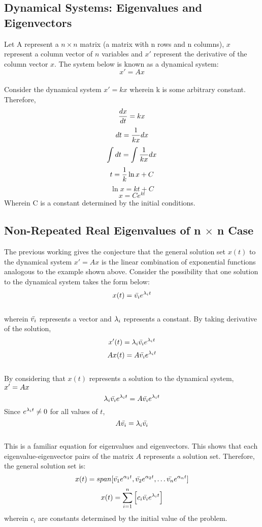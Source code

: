 \documentclass[a4paper, 12pt]{report}
\begin{document}
\begin{center}
\chapter{Dynamical Systems: Eigenvalues and Eigenvectors}
\begin{comment}
\end{comment}
Let A represent a $n \times n$ matrix (a matrix with n rows and n columns), $x$ represent a column vector of $n$ variables and $x'$ represent the derivative of the column vector $x$. The system below is known as a dynamical system:
$$x' = Ax$$
\\Consider the dynamical system $x' = kx$ wherein k is some arbitrary constant. Therefore,
$$\frac{dx}{dt} = kx$$
$$dt = \frac{1}{kx}dx$$
$$\int dt = \int \frac{1}{kx}dx$$
$$t = \frac{1}{k}\ln{x}+ C$$
$$\ln{x} = kt + C$$
$$x = Ce^{kt}$$
Wherein C is a constant determined by the initial conditions.
\section{Non-Repeated Real Eigenvalues of n $\times$ n Case}
\begin{comment}
\end{comment}
The previous working gives the conjecture that the general solution set $x(t)$ to the dynamical system $x' = Ax$ is the linear combination of exponential functions analogous to the example shown above. Consider the possibility that one solution to the dynamical system takes the form below:
$$x(t) = \bar{v_i}e^{\lambda_i t}$$
\\wherein $\bar{v_i}$ represents a vector and $\lambda_i$ represents a constant. By taking derivative of the solution, 
$$x'(t) = \lambda_i\bar{v_i}e^{\lambda_i t}$$
$$Ax(t) = A\bar{v_i}e^{\lambda_i t}$$
\\By considering that $x(t)$ represents a solution to the dynamical system, $\displaystyle{x' = Ax}$
$$\lambda_i\bar{v_i}e^{\lambda_i t} = A\bar{v_i}e^{\lambda_i t}$$
Since $e^{\lambda_i t} \neq 0$ for all values of $t$,
$$A\bar{v_i} = \lambda_i\bar{v_i}$$
\\This is a familiar equation for eigenvalues and eigenvectors. This shows that each eigenvalue-eigenvector pairs of the matrix $A$ represents a solution set. Therefore, the general solution set is:
$$x(t) = span[\bar{v_1}e^{\alpha_1 t}, \bar{v_2}e^{\alpha_2 t}, \dots \bar{v_n}e^{\alpha_n t}]$$
$$x(t) = \sum_{i = 1}^{n} \left[c_i\bar{v_i}e^{\lambda_i t}\right]$$
wherein $c_i$ are constants determined by the initial value of the problem. 

\end{center}
\end{document}
